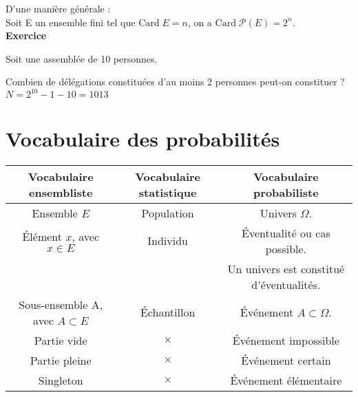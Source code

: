 \vspace{.3cm}

D'une manière générale : \\ Soit E un ensemble fini tel que $\mathrm{Card} \; E = n$, on a $\mathrm{Card} \; \mathcal{P} \left(E\right) = 2^n$. \\

\textbf{Exercice}

Soit une assemblée de 10 personnes.

Combien de délégations constituées d'au moins 2 personnes peut-on constituer ? \\

$ N = 2^{10} - 1 - 10 = 1013$ \\



\newpage 

\section{Vocabulaire des probabilités}

\begin{tabular}{c|c|c}
Vocabulaire ensembliste & Vocabulaire statistique & Vocabulaire probabiliste \\
\hline
Ensemble $E$ & Population & Univers $\Omega$. \\
\hline
Élément $x$, avec $x\in E$ & Individu & Éventualité ou cas possible. \\
& & Un univers est constitué d'éventualités. \\
\hline
Sous-ensemble A, avec $A\subset E$ & Échantillon & Événement $A \subset \Omega$. \\
\hline
Partie vide & \Large{$\times$} & Événement impossible \\
\hline
Partie pleine & \Large{$\times$} & Événement certain \\
\hline
Singleton & \Large{$\times$} & Événement élémentaire \\
\end{tabular}

